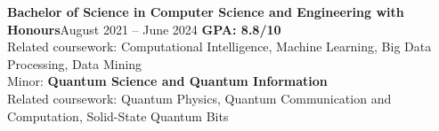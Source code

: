     {\textbf{Bachelor of Science in Computer Science and Engineering with Honours}}{August 2021 -- June 2024}
    \vspace{6pt}
    \textbf{GPA: 8.8/10}\\
    \vspace{6pt}
    \scriptsize {\small{Related coursework: Computational Intelligence, Machine Learning, Big Data Processing, Data Mining}}\\
    \vspace{-3pt}
    \resumeItemListStart
    \resumeItemListEnd
    \scriptsize {\small{Minor: \textbf{Quantum Science and Quantum Information}}}\\
    \scriptsize {\small{Related coursework: Quantum Physics, Quantum Communication and Computation, Solid-State Quantum Bits}}